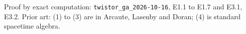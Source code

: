 Proof by exact computation: \texttt{twistor\_ga\_2026-10-16}, E1.1 to E1.7 and E3.1, E3.2. Prior art: (1) to (3) are in Arcaute, Lasenby and Doran; (4) is standard spacetime algebra.
